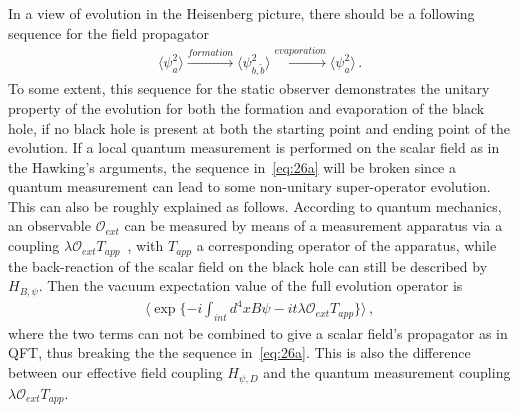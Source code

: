 \documentclass[12pt,a4paper]{article}
\begin{document}
In a view of evolution in the Heisenberg picture, there should be a following sequence for the field propagator
\begin{equation}
\label{eq:26a}
\begin{split}
\langle\psi_{a}^2\rangle\stackrel{formation}{\longrightarrow}\langle\psi_{b,\tilde{b}}^2\rangle\stackrel{evaporation}{\longrightarrow}\langle\psi_{a}^2\rangle
\,.
\end{split}
\end{equation}
To some extent, this sequence for the static observer demonstrates the unitary property of the evolution for both the formation and evaporation of the black hole, if no black hole is present at both the starting point and ending point of the evolution. If a local quantum measurement is performed on the scalar field as in the Hawking's arguments, the sequence in~\eqref{eq:26a} will be broken since a quantum measurement can lead to some non-unitary super-operator evolution. This can also be roughly explained as follows. According to quantum mechanics, an observable $\mathcal {O}_{ext}$ can be measured by means of a measurement apparatus via a coupling $\lambda\mathcal {O}_{ext}T_{app}$~\cite{i}, with $T_{app}$ a corresponding operator of the apparatus, while the back-reaction of the scalar field on the black hole can still be described by $H_{B,\psi}$. Then the vacuum expectation value of the full evolution operator is
\begin{equation}
\label{eq:26b}
\begin{split}
\langle\exp\{-i\int_{int} d^4xB\psi-it\lambda\mathcal {O}_{ext}T_{app}\}\rangle \,,
\end{split}
\end{equation}
where the two terms can not be combined to give a scalar field's propagator as in QFT, thus breaking the the sequence in~\eqref{eq:26a}. This is also the difference between our effective field coupling $H_{\psi,D}$ and the quantum measurement coupling $\lambda\mathcal {O}_{ext}T_{app}$.
\end{document}
